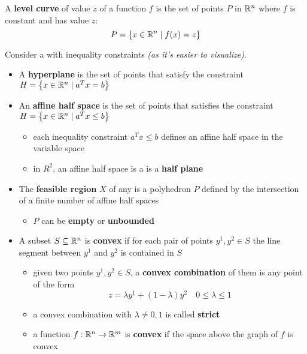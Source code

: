 \documentclass[english]{article}
\begin{document}
\begin{definition}
  \label{def:level-curve}
  A \textbf{level curve} of value \(z\) of a function \(f\) is the set of points \(P\) in \(\mathbb{R}^n\) where \(f\) is constant and has value \(z\):
  \[P = \left\{ x \in \mathbb{R}^n \mid f(x) = z \right\}\]
\end{definition}

\bigskip
Consider a \LP with inequality constraints \textit{(as it's easier to visualize)}.

\begin{itemize}
  \item A \textbf{hyperplane} is the set of points that satisfy the constraint
        \( H = \left\{ x \in \mathbb{R}^n \mid   a^T x = b \right\} \)
  \item An \textbf{affine half space} is the set of points that satisfies the constraint
        \(H = \left\{ x \in \mathbb{R}^n \mid   a^T x \leq b \right\} \)
        \begin{itemize}[label=\(\rightarrow\)]
          \item each inequality constraint \(a^T x \leq b\) defines an affine half space in the variable space
          \item in \(R^2\), an affine half space is a is a \textbf{half plane}
        \end{itemize}
  \item The \textbf{feasible region} \(X\) of any \LP is a polyhedron \(P\) defined by the intersection of a finite number of affine half spaces
        \begin{itemize}[label=\(\rightarrow\)]
          \item \(P\) can be \textbf{empty} or \textbf{unbounded}
        \end{itemize}
  \item A subset \(S \subseteq \mathbb{R}^n\) is \textbf{convex} if for each pair of points \(y^1, y^2 \in S\) the line segment between \(y^1\) and \(y^2\) is contained in \(S\)
        \begin{itemize}[label=\(\rightarrow\)]
          \item given two points \(y^1, y^2 \in S\), a \textbf{convex combination} of them is any point of the form
                \[ z = \lambda y^1 + \left( 1 - \lambda \right) y^2 \quad 0 \leq \lambda \leq 1 \]
          \item a convex combination with \(\lambda \neq 0, 1\) is called \textbf{strict}
          \item a function \(f: \mathbb{R}^n \rightarrow \mathbb{R}^m\) is \textbf{convex} if the space above the graph of \(f\) is convex

\end{itemize}
\end{itemize}
\end{document}
